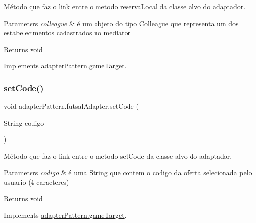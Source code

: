Método que faz o link entre o metodo reserva\+Local da classe alvo do adaptador. 


\begin{DoxyParams}{Parameters}
{\em colleague} & é um objeto do tipo Colleague que representa um dos estabelecimentos cadastrados no mediator \\
\hline
\end{DoxyParams}
\begin{DoxyReturn}{Returns}
void 
\end{DoxyReturn}


Implements \mbox{\hyperlink{interfaceadapter_pattern_1_1game_target_a663405a3d10988de25c6ea3ef63c68eb}{adapter\+Pattern.\+game\+Target}}.

\mbox{\label{classadapter_pattern_1_1futsal_adapter_a63b50886ea0df5062fdeb086811c22ba}} 
\subsubsection{\texorpdfstring{setCode()}{setCode()}}
{\footnotesize\ttfamily void adapter\+Pattern.\+futsal\+Adapter.\+set\+Code (\begin{DoxyParamCaption}\item[{String}]{codigo }\end{DoxyParamCaption})}



Método que faz o link entre o metodo set\+Code da classe alvo do adaptador. 


\begin{DoxyParams}{Parameters}
{\em codigo} & é uma String que contem o codigo da oferta selecionada pelo usuario (4 caracteres) \\
\hline
\end{DoxyParams}
\begin{DoxyReturn}{Returns}
void 
\end{DoxyReturn}


Implements \mbox{\hyperlink{interfaceadapter_pattern_1_1game_target_a9ea61c0d011aa457f9a8c887d086044a}{adapter\+Pattern.\+game\+Target}}.

\mbox{\label{classadapter_pattern_1_1futsal_adapter_a5832c5c7032e7254a7d3476e72f9834f}} 
